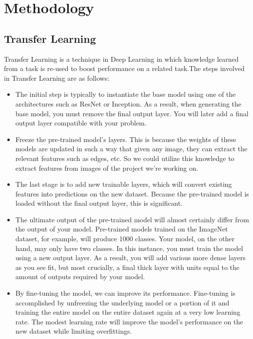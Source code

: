 \documentclass[conference]{IEEEtran}
\begin{document}
\section{Methodology}

\subsection{Transfer Learning}
Transfer Learning is a technique in Deep Learning in which knowledge learned from a task is re-used to boost performance on a related task.The steps involved in Transfer Learning are as follows:
\begin{itemize}

\item The initial step is typically to instantiate the base model using one of the architectures such as ResNet or Inception. As a result, when generating the base model, you must remove the final output layer. You will later add a final output layer compatible with your problem.
\item Freeze the pre-trained model's layers. This is because the weights of these models are updated in such a way that given any image, they can extract the relevant features such as edges, etc. So we could utilize this knowledge to extract features from images of the project we're working on.
\item The last stage is to add new trainable layers, which will convert existing features into predictions on the new dataset. Because the pre-trained model is loaded without the final output layer, this is significant.
\item The ultimate output of the pre-trained model will almost certainly differ from the output of your model. Pre-trained models trained on the ImageNet dataset, for example, will produce 1000 classes. Your model, on the other hand, may only have two classes. In this instance, you must train the model using a new output layer. As a result, you will add various more dense layers as you see fit, but most crucially, a final thick layer with units equal to the amount of outputs required by your model.
\item By fine-tuning the model, we can improve its performance. Fine-tuning is accomplished by unfreezing the underlying model or a portion of it and training the entire model on the entire dataset again at a very low learning rate. The modest learning rate will improve the model's performance on the new dataset while limiting overfittings.

\end{itemize}
\end{document}
